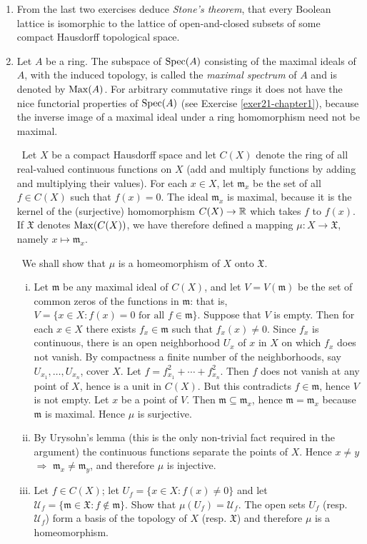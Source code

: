 \begin{enumerate}
    \item \label{exer25-chapter1}From the last two exercises deduce \emph{Stone's theorem}, that every Boolean lattice is isomorphic to the lattice of open-and-closed subsets of some compact Hausdorff topological space.

    \item \label{exer26-chapter1}Let $A$ be a ring. The subspace of $\operatorname{Spec}(A)$ consisting of the maximal ideals of $A$, with the induced topology, is called the \emph{maximal spectrum} of $A$ and is denoted by $\operatorname{Max}(A)$. For arbitrary commutative rings it does not have the nice functorial properties of $\operatorname{Spec}(A)$ (see Exercise \ref{exer21-chapter1}), because the inverse image of a maximal ideal under a ring homomorphism need not be maximal.
    
    \quad\, Let $X$ be a compact Hausdorff space and let $C(X)$ denote the ring of all real-valued continuous functions on $X$ (add and multiply functions by adding and multiplying their values). For each $x \in X$, let $\mathfrak{m}_x$ be the set of all $f \in C(X)$ such that $f(x) = 0$. The ideal $\mathfrak{m}_x$ is maximal, because it is the kernel of the (surjective) homomorphism $C(X) \to \mathbb{R}$ which takes $f$ to $f(x)$. If $\mathfrak{X}$ denotes $\operatorname{Max}(C(X))$, we have therefore defined a mapping $\mu \colon X \to \mathfrak{X}$, namely $x \mapsto \mathfrak{m}_x$.

    \quad\, We shall show that $\mu$ is a homeomorphism of $X$ onto $\mathfrak{X}$.
    \begin{enumerate}[i)]
        \item Let $\mathfrak{m}$ be any maximal ideal of $C(X)$, and let $V = V(\mathfrak{m})$ be the set of common zeros of the functions in $\mathfrak{m}$: that is, $V = \{x \in X : f(x) = 0 \text{ for all } f \in \mathfrak{m}\}$. Suppose that $V$ is empty. Then for each $x \in X$ there exists $f_x \in \mathfrak{m}$ such that $f_x(x) \neq 0$. Since $f_x$ is continuous, there is an open neighborhood $U_x$ of $x$ in $X$ on which $f_x$ does not vanish. By compactness a finite number of the neighborhoods, say $U_{x_1}, \ldots, U_{x_n}$, cover $X$. Let $f = f_{x_1}^2 + \cdots + f_{x_n}^2$. Then $f$ does not vanish at any point of $X$, hence is a unit in $C(X)$. But this contradicts $f \in \mathfrak{m}$, hence $V$ is not empty. Let $x$ be a point of $V$. Then $\mathfrak{m} \subseteq \mathfrak{m}_x$, hence $\mathfrak{m} = \mathfrak{m}_x$ because $\mathfrak{m}$ is maximal. Hence $\mu$ is surjective.
        \item By Urysohn's lemma (this is the only non-trivial fact required in the argument) the continuous functions separate the points of $X$. Hence $x \neq y$ $\Rightarrow$ $\mathfrak{m}_x \neq \mathfrak{m}_y$, and therefore $\mu$ is injective.
        \item Let $f \in C(X)$; let $U_f = \{x \in X : f(x) \neq 0\}$ and let $\mathcal{U}_f = \{\mathfrak{m} \in \mathfrak{X} : f \notin \mathfrak{m}\}$. Show that $\mu(U_f) = \mathcal{U}_f$. The open sets $U_f$ (resp. $\mathcal{U}_f$) form a basis of the topology of $X$ (resp. $\mathfrak{X}$) and therefore $\mu$ is a homeomorphism.
        

\end{enumerate}
\end{enumerate}
